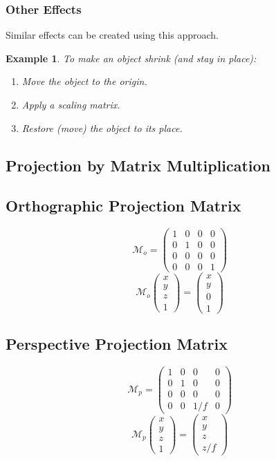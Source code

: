 \documentclass[11pt]{article}
\newtheorem{eg}{Example}
\begin{document}
\subsubsection{Other Effects}
Similar effects can be created using this approach.
\begin{eg}
  To make an object shrink (and stay in place):
  \begin{enumerate}
    \item Move the object to the origin.
    \item Apply a scaling matrix.
    \item Restore (move) the object to its place.
  \end{enumerate}
\end{eg}

\subsection{Projection by Matrix Multiplication}
\subsection{Orthographic Projection Matrix}
\[
  \mathcal{M}_o =
  \begin{pmatrix}
    1 & 0 & 0 & 0 \\
    0 & 1 & 0 & 0 \\
    0 & 0 & 0 & 0 \\
    0 & 0 & 0 & 1
  \end{pmatrix}
\]
\[
  \mathcal{M}_o
  \begin{pmatrix}
    x \\ y \\ z \\ 1
  \end{pmatrix}
  =
  \begin{pmatrix}
    x \\ y \\ 0 \\ 1
  \end{pmatrix}
\]

\subsection{Perspective Projection Matrix}
\[
  \mathcal{M}_p =
  \begin{pmatrix}
    1 & 0 & 0 & 0 \\
    0 & 1 & 0 & 0 \\
    0 & 0 & 0 & 0 \\
    0 & 0 & 1 / f & 0
  \end{pmatrix}
\]
\[
  \mathcal{M}_p
  \begin{pmatrix}
    x \\ y \\ z \\ 1
  \end{pmatrix}
  =
  \begin{pmatrix}
    x \\ y \\ z \\ z / f
  \end{pmatrix}
\]
\end{document}
